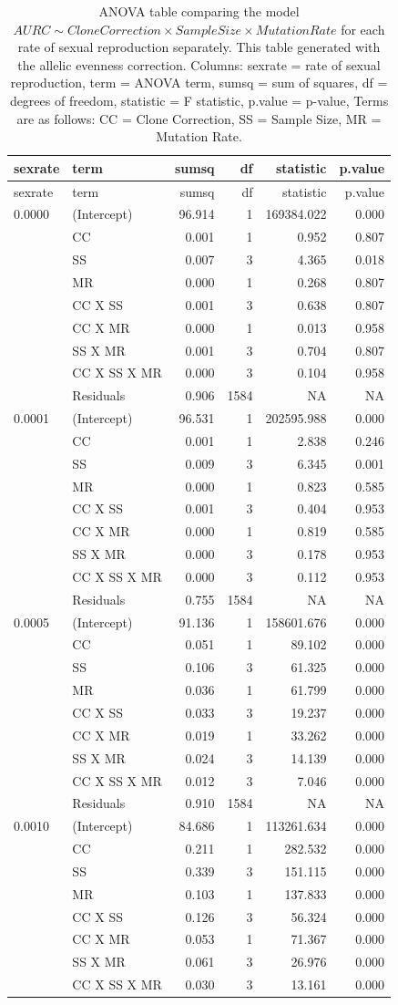 \documentclass[]{article}
\theoremstyle{definition}
\theoremstyle{definition}
\theoremstyle{definition}
\theoremstyle{remark}
\begin{document}
\begin{longtable}[]{@{}llrrrr@{}}
\caption{\label{tab:sim4} ANOVA table comparing the model
\(AURC \sim Clone Correction \times Sample Size \times Mutation Rate\)
for each rate of sexual reproduction separately. This table generated
with the allelic evenness correction. Columns: sexrate = rate of sexual
reproduction, term = ANOVA term, sumsq = sum of squares, df = degrees of
freedom, statistic = F statistic, p.value = p-value, Terms are as
follows: CC = Clone Correction, SS = Sample Size, MR = Mutation
Rate.}\tabularnewline
\toprule
sexrate & term & sumsq & df & statistic & p.value\tabularnewline
\midrule
\endfirsthead
\toprule
sexrate & term & sumsq & df & statistic & p.value\tabularnewline
\midrule
\endhead
0.0000 & (Intercept) & 96.914 & 1 & 169384.022 & 0.000\tabularnewline
& CC & 0.001 & 1 & 0.952 & 0.807\tabularnewline
& SS & 0.007 & 3 & 4.365 & 0.018\tabularnewline
& MR & 0.000 & 1 & 0.268 & 0.807\tabularnewline
& CC X SS & 0.001 & 3 & 0.638 & 0.807\tabularnewline
& CC X MR & 0.000 & 1 & 0.013 & 0.958\tabularnewline
& SS X MR & 0.001 & 3 & 0.704 & 0.807\tabularnewline
& CC X SS X MR & 0.000 & 3 & 0.104 & 0.958\tabularnewline
& Residuals & 0.906 & 1584 & NA & NA\tabularnewline
0.0001 & (Intercept) & 96.531 & 1 & 202595.988 & 0.000\tabularnewline
& CC & 0.001 & 1 & 2.838 & 0.246\tabularnewline
& SS & 0.009 & 3 & 6.345 & 0.001\tabularnewline
& MR & 0.000 & 1 & 0.823 & 0.585\tabularnewline
& CC X SS & 0.001 & 3 & 0.404 & 0.953\tabularnewline
& CC X MR & 0.000 & 1 & 0.819 & 0.585\tabularnewline
& SS X MR & 0.000 & 3 & 0.178 & 0.953\tabularnewline
& CC X SS X MR & 0.000 & 3 & 0.112 & 0.953\tabularnewline
& Residuals & 0.755 & 1584 & NA & NA\tabularnewline
0.0005 & (Intercept) & 91.136 & 1 & 158601.676 & 0.000\tabularnewline
& CC & 0.051 & 1 & 89.102 & 0.000\tabularnewline
& SS & 0.106 & 3 & 61.325 & 0.000\tabularnewline
& MR & 0.036 & 1 & 61.799 & 0.000\tabularnewline
& CC X SS & 0.033 & 3 & 19.237 & 0.000\tabularnewline
& CC X MR & 0.019 & 1 & 33.262 & 0.000\tabularnewline
& SS X MR & 0.024 & 3 & 14.139 & 0.000\tabularnewline
& CC X SS X MR & 0.012 & 3 & 7.046 & 0.000\tabularnewline
& Residuals & 0.910 & 1584 & NA & NA\tabularnewline
0.0010 & (Intercept) & 84.686 & 1 & 113261.634 & 0.000\tabularnewline
& CC & 0.211 & 1 & 282.532 & 0.000\tabularnewline
& SS & 0.339 & 3 & 151.115 & 0.000\tabularnewline
& MR & 0.103 & 1 & 137.833 & 0.000\tabularnewline
& CC X SS & 0.126 & 3 & 56.324 & 0.000\tabularnewline
& CC X MR & 0.053 & 1 & 71.367 & 0.000\tabularnewline
& SS X MR & 0.061 & 3 & 26.976 & 0.000\tabularnewline
& CC X SS X MR & 0.030 & 3 & 13.161 & 0.000\tabularnewline

\end{longtable}
\end{document}

